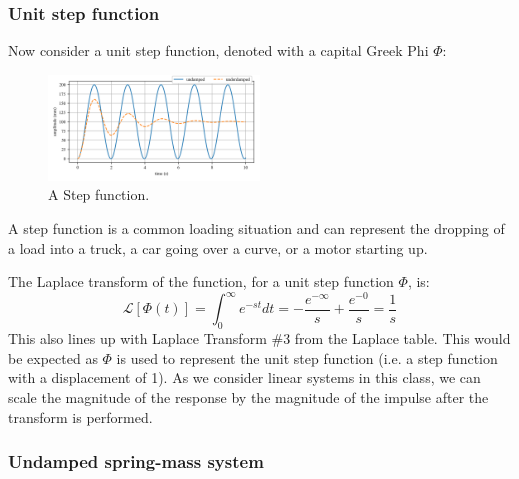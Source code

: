 \documentclass[12pt,letter]{article}
\numberwithin{ex}{section} %
\numberwithin{re}{section} %
\newcommand{\Laplace}[1]{\ensuremath{\mathcal{L}{\left[#1\right]}}}
\begin{document}
\subsubsection{Unit step function}
Now consider a unit step function, denoted with a capital Greek Phi  $\Phi$: 

\begin{figure}[H]
	\centering
	\includegraphics[width=0.5\textwidth]{../Figures/unit_step.png}
	\caption{A Step function. }
\end{figure}

A step function is a common loading situation and can represent the dropping of a load into a truck, a car going over a curve, or a motor starting up. 


The Laplace transform of the function, for a unit step function $\Phi$, is: 
\begin{equation*}
\Laplace{\Phi(t)} = \int_{0}^{\infty} e^{-st}dt = -\frac{e^{-\infty}}{s} +\frac{e^{-0}}{s} =\frac{1}{s}
\end{equation*}
This also lines up with Laplace Transform \#3 from the Laplace table. This would be expected as $\Phi$ is used to represent the unit step function (i.e. a step function with a displacement of 1). As we consider linear systems in this class, we can scale the magnitude of the response by the magnitude of the impulse after the transform is performed. 

\subsubsection{Undamped spring-mass system}
\end{document}
